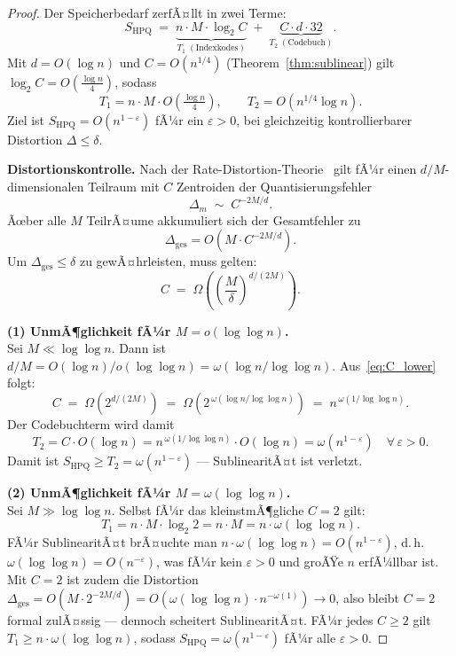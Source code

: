 ﻿\documentclass[12pt,a4paper]{article}
\begin{document}
\begin{proof}
Der Speicherbedarf zerfÃ¤llt in zwei Terme:
\begin{equation}
  S_{\mathrm{HPQ}} 
  \;=\; \underbrace{n \cdot M \cdot \log_2 C}_{\displaystyle T_1\;(\text{Indexkodes})}
  \;+\; \underbrace{C \cdot d \cdot 32}_{\displaystyle T_2\;(\text{Codebuch})}.
  \label{eq:split}
\end{equation}
Mit $d = O(\log n)$ und $C = O(n^{1/4})$ (Theorem~\ref{thm:sublinear}) gilt 
$\log_2 C = O(\frac{\log n}{4})$, sodass
\[
  T_1 = n \cdot M \cdot O\!\left(\tfrac{\log n}{4}\right), \qquad
  T_2 = O\!\left(n^{1/4}\log n\right).
\]
Ziel ist $S_{\mathrm{HPQ}} = O(n^{1-\varepsilon})$ fÃ¼r ein $\varepsilon > 0$,
bei gleichzeitig kontrollierbarer Distortion $\Delta \leq \delta$.

\medskip
\textbf{Distortionskontrolle.}
Nach der Rate-Distortion-Theorie~\cite{berger1971ratedistortion} gilt 
fÃ¼r einen $d/M$-dimensionalen Teilraum mit $C$ Zentroiden der 
Quantisierungsfehler
\[
  \Delta_m \;\sim\; C^{-2M/d}.
\]
Ãœber alle $M$ TeilrÃ¤ume akkumuliert sich der Gesamtfehler zu
\[
  \Delta_{\mathrm{ges}} = O\!\left(M \cdot C^{-2M/d}\right).
\]
Um $\Delta_{\mathrm{ges}} \leq \delta$ zu gewÃ¤hrleisten, muss gelten:
\begin{equation}
  C \;=\; \Omega\!\left(\!\left(\frac{M}{\delta}\right)^{d/(2M)}\right).
  \label{eq:C_lower}
\end{equation}

\medskip
\textbf{(1) UnmÃ¶glichkeit fÃ¼r $M = o(\log\log n)$.}\\
Sei $M \ll \log\log n$. Dann ist $d/M = O(\log n)/o(\log\log n) 
= \omega(\log n/\log\log n)$.
Aus~\eqref{eq:C_lower} folgt:
\[
  C \;=\; \Omega\!\left(2^{d/(2M)}\right) 
  \;=\; \Omega\!\left(2^{\,\omega(\log n / \log\log n)}\right)
  \;=\; n^{\,\omega(1/\log\log n)}.
\]
Der Codebuchterm wird damit
\[
  T_2 = C \cdot O(\log n) 
      = n^{\,\omega(1/\log\log n)} \cdot O(\log n)
      = \omega\!\left(n^{1-\varepsilon}\right)
      \quad \forall\,\varepsilon > 0.
\]
Damit ist $S_{\mathrm{HPQ}} \geq T_2 = \omega(n^{1-\varepsilon})$ --- 
SublinearitÃ¤t ist verletzt.

\medskip
\textbf{(2) UnmÃ¶glichkeit fÃ¼r $M = \omega(\log\log n)$.}\\
Sei $M \gg \log\log n$. Selbst fÃ¼r das kleinstmÃ¶gliche $C = 2$ gilt:
\[
  T_1 = n \cdot M \cdot \log_2 2 = n \cdot M = n \cdot \omega(\log\log n).
\]
FÃ¼r SublinearitÃ¤t brÃ¤uchte man $n\cdot\omega(\log\log n) = O(n^{1-\varepsilon})$, 
d.\,h. $\omega(\log\log n) = O(n^{-\varepsilon})$, was fÃ¼r kein 
$\varepsilon > 0$ und groÃŸe $n$ erfÃ¼llbar ist. Mit $C = 2$ ist zudem 
die Distortion $\Delta_{\mathrm{ges}} = O(M \cdot 2^{-2M/d}) 
= O(\omega(\log\log n) \cdot n^{-\omega(1)}) \to 0$, also bleibt 
$C = 2$ formal zulÃ¤ssig --- dennoch scheitert SublinearitÃ¤t.
FÃ¼r jedes $C \geq 2$ gilt $T_1 \geq n \cdot \omega(\log\log n)$, 
sodass $S_{\mathrm{HPQ}} = \omega(n^{1-\varepsilon})$ fÃ¼r alle $\varepsilon > 0$.


\end{proof}
\end{document}
